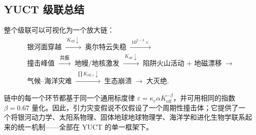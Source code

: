 \documentclass[11pt,a4paper]{article}
\begin{document}
	\subsection{YUCT 级联总结}
	
	整个级联可以可视化为一个放大链：
	{\small
		\[
		\begin{aligned}
			&\text{银河面穿越}
			\;\xrightarrow{\;K_{\mathrm{eff}}\downarrow\;}\;
			\text{奥尔特云失稳}
			\;\xrightarrow{\;10^{2-3}\times\;}\\
			&\text{撞击峰值}
			\;\xrightarrow{\;\text{共振}\;}\;
			\text{地幔/地核激发}
			\;\xrightarrow{\;K_{\mathrm{eff}}\downarrow\;}\;
			\text{陷阱火山活动 + 地磁漂移}
			\;\xrightarrow{\;}\\
			&\text{气候–海洋灾难}
			\;\xrightarrow{\;\prod K_{\mathrm{eff},i}\downarrow\;}\;
			\text{生态崩溃}
			\;\xrightarrow{\;}\;
			\text{大灭绝}.
		\end{aligned}
		\]
	}
	
	链中的每一个环节都基于同一个通用标度律 \(\varepsilon = \kappa_c \alpha K_{\mathrm{eff}}^{-\beta}\)，并可用相同的指数 \(\beta = 0.67\) 量化。因此，引力灾变假说不仅假设了一个周期性撞击体；它提供了一个将银河动力学、太阳系物理、固体地球地球物理学、海洋学和进化生物学联系起来的统一机制——全部在 YUCT 的单一框架下。
	
\end{document}
